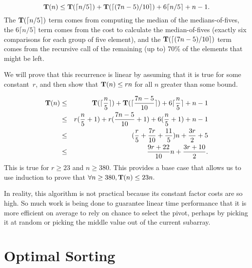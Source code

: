 {\small
\[{\bf T}(n) \leq {\bf T}(\lceil n/5 \rceil) +
  {\bf T}(\lceil (7n - 5)/10\rceil) + 6\lceil n/5 \rceil + n - 1.\]
}
\noindent 
The \({\bf T}(\lceil n/5 \rceil)\) term comes from computing the
median of the medians-of-fives,
the \(6\lceil n/5 \rceil\) term comes from the cost to calculate the
median-of-fives (exactly six comparisons for each group of five
element),
and the \({\bf T}(\lceil (7n - 5)/10\rceil)\) term comes from the
recursive call of the remaining (up to) 70\% of the elements that
might be left.

We will prove that this recurrence is linear by assuming
that it is true for some constant~\(r\), and then show
that \(\mbox{$\textbf{T}(n)$} \leq rn\) for all \(n\) greater than some bound.

{\small
\begin{eqnarray*}
\mbox{$\textbf{T}(n)$} &\leq& {\bf T}(\lceil \frac{n}{5} \rceil) +
           {\bf T}(\lceil \frac{7n - 5}{10}\rceil) +
           6\lceil \frac{n}{5} \rceil + n - 1\\
&\leq&r(\frac{n}{5} + 1) + r(\frac{7n-5}{10} + 1) + 6(\frac{n}{5} + 1) + n - 1\\
&\leq&(\frac{r}{5} + \frac{7r}{10} + \frac{11}{5})n + \frac{3r}{2} + 5\\
&\leq&\frac{9r + 22}{10}n + \frac{3r + 10}{2}.
\end{eqnarray*}}
\noindent This is true for \(r \geq 23\) and \(n \geq 380\).
This provides a base case that allows us to use induction to prove
that
\(\forall n \geq 380, \mbox{$\textbf{T}(n)$} \leq 23n.\)

In reality, this algorithm is not practical
because its constant factor costs are so high.
So much work is being done to guarantee linear time performance that
it is more efficient on average to rely on chance to select the pivot,
perhaps by picking it at random or picking the middle value out of the
current subarray.

\section{Optimal Sorting}
\label{OptimalSort}

